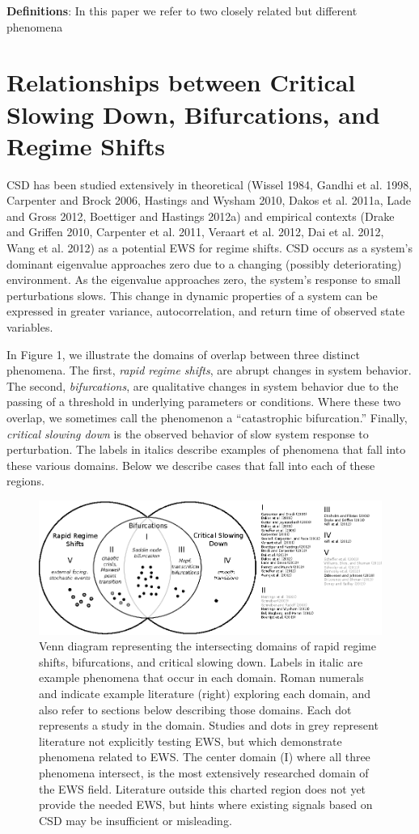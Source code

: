 \documentclass{article}
\begin{document}
\textbf{Definitions}: In this paper we refer to two closely related but
different phenomena

\section{Relationships between Critical Slowing Down, Bifurcations, and
Regime Shifts}

CSD has been studied extensively in theoretical (Wissel 1984, Gandhi et
al. 1998, Carpenter and Brock 2006, Hastings and Wysham 2010, Dakos et
al. 2011a, Lade and Gross 2012, Boettiger and Hastings 2012a) and
empirical contexts (Drake and Griffen 2010, Carpenter et al. 2011,
Veraart et al. 2012, Dai et al. 2012, Wang et al. 2012) as a potential
EWS for regime shifts. CSD occurs as a system's dominant eigenvalue
approaches zero due to a changing (possibly deteriorating) environment.
As the eigenvalue approaches zero, the system's response to small
perturbations slows. This change in dynamic properties of a system can
be expressed in greater variance, autocorrelation, and return time of
observed state variables.

In Figure 1, we illustrate the domains of overlap between three distinct
phenomena. The first, \emph{rapid regime shifts}, are abrupt changes in
system behavior. The second, \emph{bifurcations}, are qualitative
changes in system behavior due to the passing of a threshold in
underlying parameters or conditions. Where these two overlap, we
sometimes call the phenomenon a ``catastrophic bifurcation.'' Finally,
\emph{critical slowing down} is the observed behavior of slow system
response to perturbation. The labels in italics describe examples of
phenomena that fall into these various domains. Below we describe cases
that fall into each of these regions.

\begin{figure}[htbp]
\centering
\includegraphics{ews-venn.eps}
\caption{Venn diagram representing the intersecting domains of rapid
regime shifts, bifurcations, and critical slowing down. Labels in italic
are example phenomena that occur in each domain. Roman numerals and
indicate example literature (right) exploring each domain, and also
refer to sections below describing those domains. Each dot represents a
study in the domain. Studies and dots in grey represent literature not
explicitly testing EWS, but which demonstrate phenomena related to EWS.
The center domain (I) where all three phenomena intersect, is the most
extensively researched domain of the EWS field. Literature outside this
charted region does not yet provide the needed EWS, but hints where
existing signals based on CSD may be insufficient or misleading.}
\end{figure}
\end{document}
